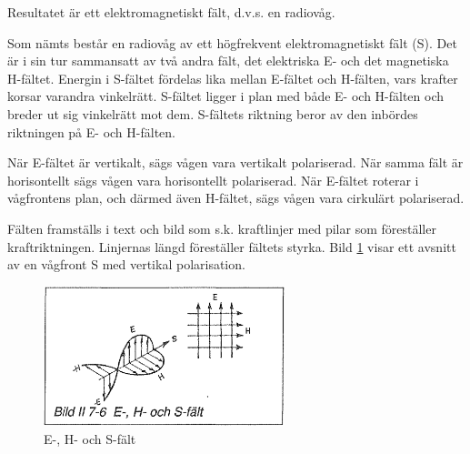 Resultatet är ett elektromagnetiskt fält, d.v.s. en radiovåg.

Som nämts består en radiovåg av ett högfrekvent elektromagnetiskt fält
(S). Det är i sin tur sammansatt av två andra fält, det elektriska E-
och det magnetiska H-fältet.  Energin i S-fältet fördelas lika mellan
E-fältet och H-fälten, vars krafter korsar varandra
vinkelrätt. S-fältet ligger i plan med både E- och H-fälten och breder
ut sig vinkelrätt mot dem. S-fältets riktning beror av den inbördes
riktningen på E- och H-fälten.

När E-fältet är vertikalt, sägs vågen vara vertikalt polariserad. När
samma fält är horisontellt sägs vågen vara horisontellt
polariserad. När E-fältet roterar i vågfrontens plan, och därmed även
H-fältet, sägs vågen vara cirkulärt polariserad.

Fälten framställs i text och bild som s.k.  kraftlinjer med pilar som
föreställer kraftriktningen. Linjernas längd föreställer fältets
styrka. Bild \ref{fig:BildII7-06} visar ett avsnitt av en vågfront S med vertikal
polarisation.

\begin{figure}[h]
\begin{center}
\includegraphics[width=7cm]{images/bild_2_7-06}
\caption{E-, H- och S-fält}
\label{fig:BildII7-06}
\end{center}
\end{figure}
